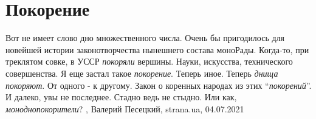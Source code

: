  
 
 
 
 
\chapter{Покорение}

Вот не имеет слово дно множественного числа. Очень бы пригодилось для новейшей
истории законотворчества нынешнего состава моноРады. Когда-то, при треклятом
совке, в УССР \emph{покоряли} вершины. Науки, искусства, технического совершенства. Я
еще застал такое \emph{покорение}. Теперь иное. Теперь \emph{днища покоряют}. От одного - к
другому. Закон о коренных народах из этих \enquote{\emph{покорений}}. И далеко, увы не
последнее. Стадно ведь не стыдно. Или как, \emph{моноднопокорители}?
, 
Валерий Песецкий, strana.ua, 04.07.2021
